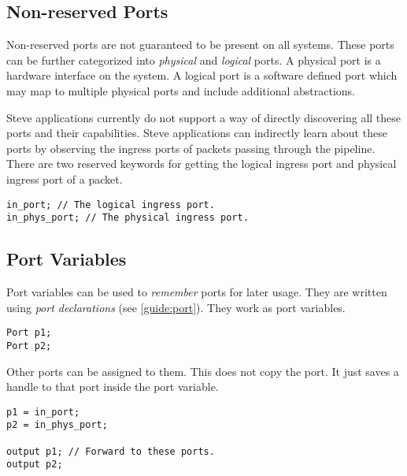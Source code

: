 \subsection{Non-reserved Ports} \label{tut:regular_ports}

Non-reserved ports are not guaranteed to be present on all systems.
These ports can be further categorized into \textit{physical} and
\textit{logical} ports. A physical port is a hardware interface on the system. A
logical port is a software defined port which may map to multiple physical ports
and include additional abstractions.

Steve applications currently do not support a way of directly discovering all
these ports and their capabilities. Steve applications can indirectly learn
about these ports by observing the ingress ports of packets passing
through the pipeline.
There are two reserved keywords for getting the logical ingress port and physical ingress port of a packet.

\begin{codepage}
\begin{lstlisting}
in_port; // The logical ingress port.
in_phys_port; // The physical ingress port.
\end{lstlisting}
\end{codepage}

\subsection{Port Variables} \label{tut:declared_ports}

Port variables can be used to \textit{remember} ports for later usage. They are
written using \textit{port declarations} (see \ref{guide:port}).
They work as port variables.

\begin{codepage}
\begin{lstlisting}
Port p1;
Port p2;
\end{lstlisting}
\end{codepage}

Other ports can be assigned to them. This does not copy the port. It just saves
a handle to that port inside the port variable.

\begin{codepage}
\begin{lstlisting}
p1 = in_port; 
p2 = in_phys_port;

output p1; // Forward to these ports.
output p2;
\end{lstlisting}
\end{codepage}

